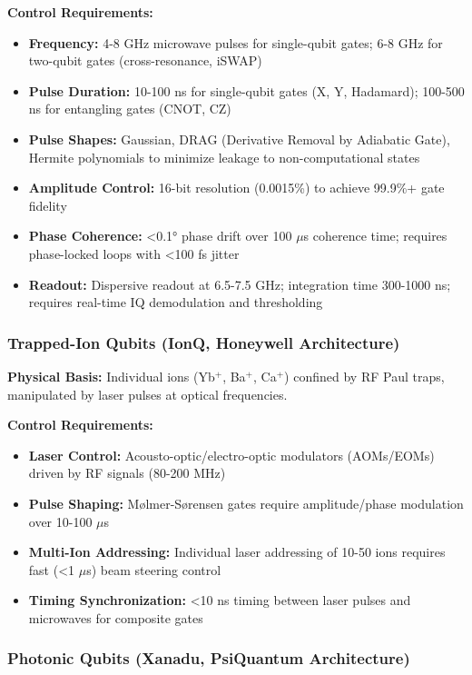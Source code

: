 \documentclass[12pt,a4paper]{article}
\begin{document}
\textbf{Control Requirements:}
\begin{itemize}[leftmargin=*]
    \item \textbf{Frequency:} 4-8 GHz microwave pulses for single-qubit gates; 6-8 GHz for two-qubit gates (cross-resonance, iSWAP)
    \item \textbf{Pulse Duration:} 10-100 ns for single-qubit gates (X, Y, Hadamard); 100-500 ns for entangling gates (CNOT, CZ)
    \item \textbf{Pulse Shapes:} Gaussian, DRAG (Derivative Removal by Adiabatic Gate), Hermite polynomials to minimize leakage to non-computational states
    \item \textbf{Amplitude Control:} 16-bit resolution (0.0015\%) to achieve 99.9\%+ gate fidelity
    \item \textbf{Phase Coherence:} <0.1° phase drift over 100 $\mu$s coherence time; requires phase-locked loops with <100 fs jitter
    \item \textbf{Readout:} Dispersive readout at 6.5-7.5 GHz; integration time 300-1000 ns; requires real-time IQ demodulation and thresholding
\end{itemize}

\subsubsection{Trapped-Ion Qubits (IonQ, Honeywell Architecture)}

\textbf{Physical Basis:} Individual ions (Yb$^+$, Ba$^+$, Ca$^+$) confined by RF Paul traps, manipulated by laser pulses at optical frequencies.

\textbf{Control Requirements:}
\begin{itemize}[leftmargin=*]
    \item \textbf{Laser Control:} Acousto-optic/electro-optic modulators (AOMs/EOMs) driven by RF signals (80-200 MHz)
    \item \textbf{Pulse Shaping:} Mølmer-Sørensen gates require amplitude/phase modulation over 10-100 $\mu$s
    \item \textbf{Multi-Ion Addressing:} Individual laser addressing of 10-50 ions requires fast (<1 $\mu$s) beam steering control
    \item \textbf{Timing Synchronization:} <10 ns timing between laser pulses and microwaves for composite gates
\end{itemize}

\subsubsection{Photonic Qubits (Xanadu, PsiQuantum Architecture)}
\end{document}
